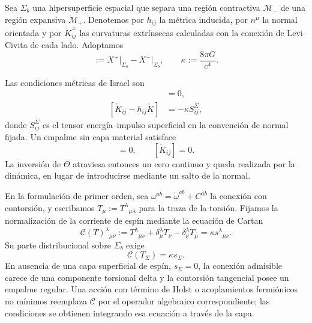 Sea \(\Sigma_b\) una hipersuperficie espacial que separa una regi\'on
contractiva \(\mathcal M_-\) de una regi\'on expansiva
\(\mathcal M_+\). Denotemos por \(h_{ij}\) la m\'etrica inducida, por
\(n^\mu\) la normal orientada y por
\(\mathring K_{ij}^\pm\) las curvaturas extr\'insecas calculadas con la
conexi\'on de Levi--Civita de cada lado. Adoptamos
\begin{equation}
 [X]:=X^+\big|_{\Sigma_b}-X^-\big|_{\Sigma_b},
 \qquad
 \kappa:=\frac{8\pi G}{c^4}.
 \label{eq:descendant-jump-kappa}
\end{equation}

Las condiciones m\'etricas de Israel son
\begin{align}
 [h_{ij}]&=0,
 \label{eq:descendant-Israel-first}\\
 [\mathring K_{ij}-h_{ij}\mathring K]
 &=-\kappa S^{\Sigma}_{ij},
 \label{eq:descendant-Israel-second}
\end{align}
donde \(S^\Sigma_{ij}\) es el tensor energ\'ia--impulso superficial en la
convenci\'on de normal fijada. Un empalme sin capa material satisface
\begin{equation}
 [h_{ij}]=0,
 \qquad
 [\mathring K_{ij}]=0.
 \label{eq:descendant-shell-free-Israel}
\end{equation}
La inversi\'on de \(\Theta\) atraviesa entonces un cero continuo y queda
realizada por la din\'amica, en lugar de introducirse mediante un salto de la
normal.

En la formulaci\'on de primer orden, sea
\(\omega^{ab}=\mathring\omega^{ab}+C^{ab}\) la conexi\'on con contorsi\'on,
y escribamos \(T_\mu:=T^\lambda{}_{\mu\lambda}\) para la traza de la
torsi\'on.
Fijamos la normalizaci\'on de la corriente de esp\'in mediante la ecuaci\'on
de Cartan
\begin{equation}
 \mathscr C(T)^{\lambda}{}_{\mu\nu}
 :=T^{\lambda}{}_{\mu\nu}
 +\delta^\lambda_\mu T_\nu
 -\delta^\lambda_\nu T_\mu
 =\kappa s^{\lambda}{}_{\mu\nu}.
 \label{eq:descendant-Cartan-equation}
\end{equation}
Su parte distribucional sobre \(\Sigma_b\) exige
\begin{equation}
 \boxed{
 \mathscr C(T_\Sigma)
 =\kappa s_\Sigma.}
 \label{eq:descendant-Cartan-junction}
\end{equation}
En ausencia de una capa superficial de esp\'in,
\(s_\Sigma=0\), la conexi\'on admisible carece de una componente torsional
delta y la contorsi\'on tangencial posee un empalme regular. Una acci\'on con
t\'ermino de Holst o acoplamientos fermi\'onicos no m\'inimos reemplaza
\(\mathscr C\) por el operador algebraico correspondiente; las condiciones
se obtienen integrando esa ecuaci\'on a trav\'es de la capa.

